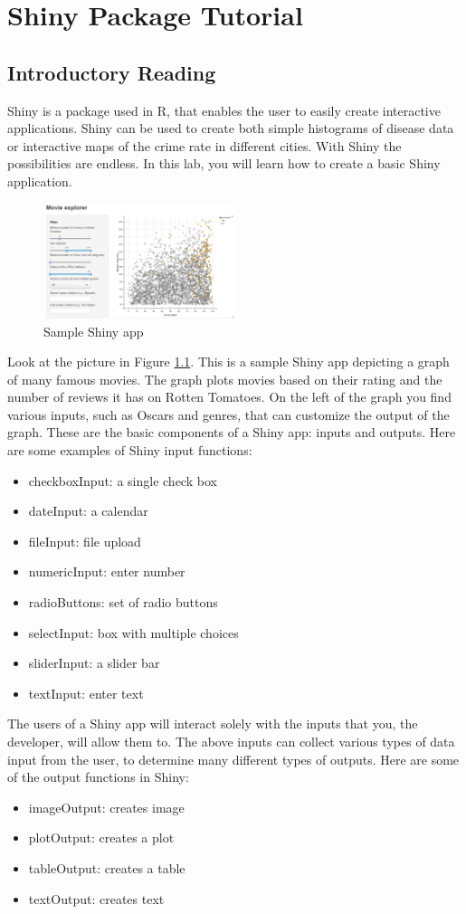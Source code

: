 \chapter{Shiny Package Tutorial}
\section{Introductory Reading}

Shiny is a package used in R, that enables the user to easily create interactive applications.
Shiny can be used to create both simple histograms of disease data or interactive maps of the crime rate in different cities.
With Shiny the possibilities are endless.
In this lab, you will learn how to create a basic Shiny application. 
\begin{figure}
   \centering
   \includegraphics[width = 0.5\textwidth]{pictures/shiny/shiny.PNG} 
   \caption{Sample Shiny app}
   \label{fig:model}
\end{figure}
\noindent Look at the picture in Figure \ref{fig:model}.
\cite{gallery} This is a sample Shiny app depicting a graph of many famous movies.
The graph plots movies based on their rating and the number of reviews it has on Rotten Tomatoes.
On the left of the graph you find various inputs, such as Oscars and genres, that can customize the output of the graph.
These are the basic components of a Shiny app: inputs and outputs.     
Here are some examples of Shiny input functions:
\begin{itemize}
    \item checkboxInput: a single check box
    \item dateInput: a calendar
    \item fileInput: file upload
    \item numericInput: enter number
    \item radioButtons: set of radio buttons
    \item selectInput: box with multiple choices
    \item sliderInput: a slider bar
    \item textInput: enter text
\end{itemize}
\noindent The users of a Shiny app will interact solely with the inputs that you, the developer, will allow them to.
The above inputs can collect various types of data input from the user, to determine many different types of outputs.
Here are some of the output functions in Shiny:
\begin{itemize}
    \item imageOutput: creates image
    \item plotOutput: creates a plot
    \item tableOutput: creates a table
    \item textOutput: creates text
\end{itemize}

